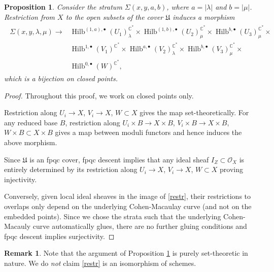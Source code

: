 \documentclass{amsart}
\newtheorem{proposition}[theorem]{Proposition}
\theoremstyle{definition}
\newtheorem{remark}[theorem]{Remark}
\newcommand{\CC} {\mathbb{C}}          %
\renewcommand{\O}{\mathcal{O}}
\newcommand{\Hilb}{\operatorname{Hilb}}
\begin{document}
\begin{proposition} \label{bij}
Consider the stratum $\Sigma(x,y,a,b)$, where $a = |\lambda|$ and $b = |\mu|$. Restriction from $X$ to the open subsets of the cover $\mathfrak{U}$ induces a morphism
\begin{align}
\begin{split} \label{restr}
\Sigma(x,y,\lambda,\mu) \longrightarrow &\Hilb^{(1,a),\bullet}(U_1)_{\lambda}^{\CC^*} \times \Hilb^{(1,b),\bullet}(U_2)_{\mu}^{\CC^*} \times \Hilb^{b,\bullet}(U_3)_{\mu}^{\CC^*} \times \\
&\Hilb^{1,\bullet}(V_1)^{\CC^*} \times \Hilb^{a,\bullet}(V_2)_{\lambda}^{\CC^*} \times \Hilb^{b,\bullet}(V_3)_{\mu}^{\CC^*} \times \\
&\Hilb^{0,\bullet}(W)^{\CC^*},
\end{split}
\end{align}
which is a bijection on closed points.
\end{proposition}
\begin{proof}
Throughout this proof, we work on closed points only.

Restriction along $U_i \rightarrow X$, $V_i \longrightarrow X$, $W \subset X$ gives the map set-theoretically. For any reduced base $B$, restriction along $U_i \times B \rightarrow X \times B$, $V_i \times B \longrightarrow X \times B$, $W \times B \subset X \times B$ gives a map between moduli functors and hence induces the above morphism.

Since $\mathfrak{U}$ is an fpqc cover, fpqc descent implies that any ideal sheaf $I_Z \subset \O_X$ is entirely determined by its restriction along $U_i \rightarrow X$, $V_i \longrightarrow X$, $W \subset X$ proving injectivity.

Conversely, given local ideal sheaves in the image of \eqref{restr}, their restrictions to overlaps only depend on the underlying Cohen-Macaulay curve (and not on the embedded points). Since we chose the strata such that the underlying Cohen-Macauly curve automatically glues, there are no further gluing conditions and fpqc descent implies surjectivity.
\end{proof}
   
\begin{remark}
Note that the argument of Proposition \ref{bij} is purely set-theoretic in nature. We do \emph{not} claim \eqref{restr} is an isomorphism of schemes. 
\end{remark}
\end{document}
